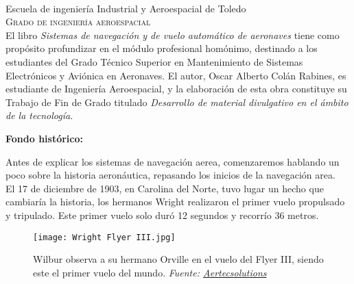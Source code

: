 


\pagestyle{empty} %

~\vfill %

\noindent Escuela de ingeniería Industrial y Aeroespacial de Toledo \\ %

\noindent \textsc{Grado de ingeniería aeroespacial}\\ %


\onehalfspacing
\noindent El libro \textit{Sistemas de navegación y de vuelo automático de aeronaves} tiene como propósito profundizar en el módulo profesional homónimo, destinado a los estudiantes del Grado Técnico Superior en Mantenimiento de Sistemas Electrónicos y Aviónica en Aeronaves. El autor, Oscar Alberto Colán Rabines, es estudiante de Ingeniería Aeroespacial, y la elaboración de esta obra constituye su Trabajo de Fin de Grado titulado\textit{ Desarrollo de material divulgativo en el ámbito de la tecnología.}


\newpage
\pagestyle{fancy}
\begin{nosangria}
\textbf{\Huge{Fondo histórico:}}\\
\end{nosangria}
\onehalfspacing

Antes de explicar los sistemas de navegación aerea, comenzaremos hablando un poco sobre la historia aeronáutica, repasando los inicios de la navegación area.\\

El 17 de diciembre de 1903, en Carolina del Norte, tuvo lugar un hecho que cambiaría la historia, los hermanos Wright realizaron el primer vuelo propulsado y tripulado. Este primer vuelo solo duró 12 segundos y recorrío 36 metros.\\

\begin{figure}[H] 
	\centering 
	\texttt{[image: Wright Flyer III.jpg]} %
	\caption{\centering Wilbur observa a su hermano Orville en el vuelo del Flyer III, siendo este el primer vuelo del mundo. \textit{Fuente: \href{https://aertecsolutions.com/2016/04/04/evolucion-en-la-estructura-de-las-aeronaves}{Aertecsolutions}}}
	\label{fig:placeholder} %
\end{figure}

